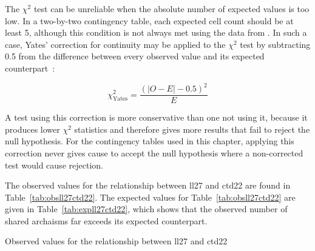 
The \(\chi^2\) test can be unreliable when the absolute number of expected values is too low. In a two-by-two contingency table, each expected cell count should be at least 5, although this condition is not always met using the data from . In such a case, Yates' correction for continuity may be applied to the \(\chi^2\) test by subtracting 0.5 from the difference between every observed value and its expected counterpart~\autocite[222]{Yat_Contingency34}:

\[\chi_\text{Yates}^2 =  \frac{(|O - E| - 0.5)^2}{E}\]

A test using this correction is more conservative than one not using it, because it produces lower \(\chi^2\) statistics and therefore gives more results that fail to reject the null hypothesis. For the contingency tables used in this chapter, applying this correction never gives cause to accept the null hypothesis where a non-corrected test would cause rejection.



The observed values for the relationship between \gls{ll27} and \gls{ctd22} are found in Table~\ref{tab:obsll27ctd22}. 
The expected values for Table~\ref{tab:obsll27ctd22} are given in Table~\ref{tab:expll27ctd22}, which shows that the observed number of shared archaisms far exceeds its expected counterpart.

\begin{table}[h]
  \centering
  \caption{Observed values for the relationship between \acrshort{ll27} and \acrshort{ctd22}}
  \label{tab:obsll27ctd22}
  
\end{table}



